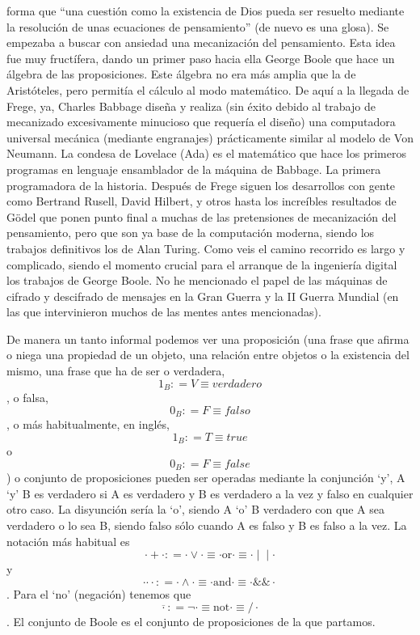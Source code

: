 \begin{enumerate}
  forma que ``una cuestión como la existencia de Dios pueda ser resuelto
  mediante la resolución de unas ecuaciones de pensamiento'' (de nuevo
  es una glosa). Se empezaba a buscar con ansiedad una mecanización del
  pensamiento. Esta idea fue muy fructífera, dando un primer paso hacia
  ella George Boole que hace un ál\-gebra de las proposiciones. Este
  álgebra no era más amplia que la de Aristóteles, pero permitía el
  cálculo al modo matemático. De aquí a la llegada de Frege, ya, Charles
  Babbage diseña y realiza (sin éxito debido al trabajo de mecanizado
  ex\-cesivamente minucioso que requería el diseño) una computadora
  universal me\-cánica (mediante engranajes) prácticamente similar al
  modelo de Von Neumann. La condesa de Lovelace (Ada) es el matemático
  que hace los primeros progra\-mas en lenguaje ensamblador de la
  máquina de Babbage. La primera programa\-dora de la historia. Después
  de Frege siguen los desarrollos con gente como Ber\-trand Rusell,
  David Hilbert, y otros hasta los increíbles resultados de Gödel que
  ponen punto final a muchas de las pretensiones de mecanización del
  pensamiento, pero que son ya base de la computación moderna, siendo
  los trabajos definitivos los de Alan Turing. Como veis el camino
  recorrido es largo y complicado, siendo el momento crucial para el
  arranque de la ingeniería digital los trabajos de George Boole. No he
  mencionado el papel de las máquinas de cifrado y descifrado de
  mensajes en la Gran Guerra y la II Guerra Mundial (en las que
  intervinieron muchos de las mentes antes mencionadas).

  De manera un tanto informal podemos ver una proposición (una frase que
  afirma o niega una propiedad de un objeto, una relación entre objetos
  o la existencia del mismo, una frase que ha de ser o verdadera,
  \[1_{B}{{: = V} \equiv \mathbf{\mathit{verdadero}}}\], o falsa,
  \[0_{B}{{: = F} \equiv \mathbf{\mathit{falso}}}\], o más
  habitualmente, en inglés,
  \[1_{B}{{: = T} \equiv \mathbf{\mathit{true}}}\] o
  \[0_{B}{{: = F} \equiv \mathbf{\mathit{false}}}\]) o conjunto de
  proposiciones pueden ser operadas mediante la conjunción `y', A `y' B
  es verdadero si A es verdadero y B es verdadero a la vez y falso en
  cualquier otro caso. La disyunción sería la `o', siendo A `o' B
  verdadero con que A sea verdadero o lo sea B, siendo falso sólo cuando
  A es falso y B es falso a la vez. La notación más habitual es
  \[{{{\cdot + \cdot}{: = {\cdot \vee \cdot}}} \equiv \cdot}\text{or}{\cdot \equiv {{\cdot \mid} \mid \cdot}}\]y\[{{{\cdot \mathbf{\cdot} \cdot}{: = {\cdot \land \cdot}}} \equiv \cdot}\text{and}{\cdot \equiv {\cdot \&\& \cdot}}\].
  Para el `no' (negación) tenemos
  que\[{{\overline{\cdot}{: = {\neg \cdot}}} \equiv \text{not}}{\cdot \equiv {/ \cdot}}\].
  El conjunto de Boole es el conjunto de proposiciones de la que
  partamos.


\end{enumerate}
